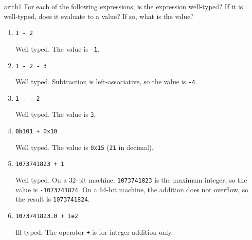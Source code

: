 %
%
%
\exercises

\begin{exercise}{arith1}
For each of the following expressions, is the expression well-typed?  If it is well-typed, does it
evaluate to a value?  If so, what is the value?

\begin{enumerate}
\item

\lstinline!1 - 2!

\begin{answer}\ifanswers
Well typed.  The value is \hbox{\lstinline/-1/}.
\fi\end{answer}

\item

\lstinline!1 - 2 - 3!

\begin{answer}\ifanswers
Well typed.  Subtraction is left-associative, so the value is
\hbox{\lstinline/-4/}.
\fi\end{answer}

\item

\lstinline!1 - - 2!

\begin{answer}\ifanswers
Well typed.  The value is \hbox{\lstinline/3/}.
\fi\end{answer}

\item

\lstinline!0b101 + 0x10!

\begin{answer}\ifanswers
Well typed.  The value is \hbox{\lstinline/0x15/} (\hbox{\lstinline/21/} in decimal).
\fi\end{answer}

\item

\lstinline!1073741823 + 1!

\begin{answer}\ifanswers
Well typed.  On a 32-bit machine, \hbox{\lstinline/1073741823/} is the maximum
integer, so the value is \hbox{\lstinline/-1073741824/}.  On a 64-bit machine, the addition does not
overflow, so the result is \hbox{\lstinline/1073741824/}.
\fi\end{answer}

\item
\lstinline!1073741823.0 + 1e2!

\begin{answer}\ifanswers
Ill typed.  The operator \hbox{\lstinline/+/} is for integer addition
only.
\fi\end{answer}


\end{enumerate}
\end{exercise}
